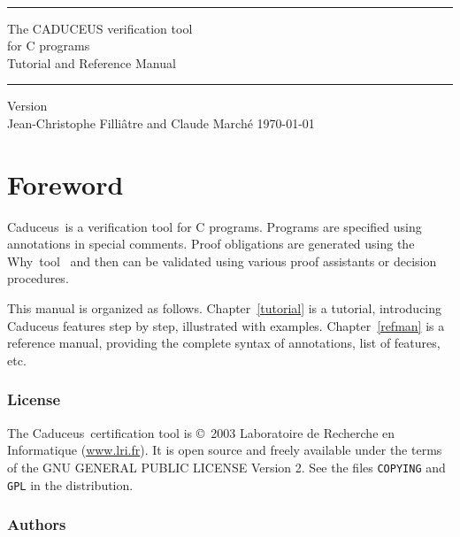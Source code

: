 \documentclass[a4paper,12pt]{report}
\newcommand{\why}{\textsf{Why}}
\newcommand{\caduceus}{\textsf{Caduceus}}
\begin{document}
\thispagestyle{empty}
\begin{center}
~\\[3cm]
\rule\textwidth{0.1cm}\\[0.5cm]
{\Huge\sf The CADUCEUS verification tool \\[0.5em] for C programs}\\[1cm]
{\Large\sf Tutorial and Reference Manual}\\[0.1cm]
\rule\textwidth{0.1cm}\\[1cm]
Version \caduceusversion\\[3cm]
Jean-Christophe Filli\^atre and Claude March\'e
\vfill
\today\\
\end{center}


\tableofcontents

\chapter*{Foreword}

\caduceus\ is a verification tool for C programs. Programs are
specified using annotations in special comments. Proof obligations are
generated using the \why\ tool~\cite{Why} and then can be validated using
various proof assistants or decision procedures.

\medskip

This manual is organized as follows. Chapter~\ref{tutorial} is a
tutorial, introducing \caduceus{} features step by step, illustrated
with examples. Chapter~\ref{refman} is a reference manual, providing
the complete syntax of annotations, list of features, etc.

\subsection*{License}

The \caduceus\ certification tool is \copyright\ 2003 Laboratoire de
Recherche en Informatique (\url{www.lri.fr}).
It is open source and freely available under the terms of the GNU
GENERAL PUBLIC LICENSE Version 2. See the files \texttt{COPYING} and
\texttt{GPL} in the distribution.

\subsection*{Authors}
\end{document}
